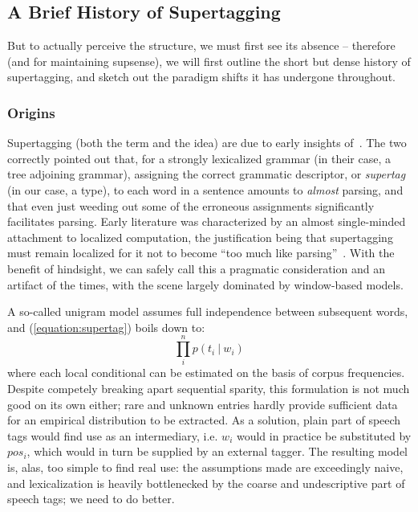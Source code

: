 \subsection{A Brief History of Supertagging}
But to actually perceive the structure, we must first see its absence -- therefore (and for maintaining supsense), we will first outline the short but dense history of supertagging, and sketch out the paradigm shifts it has undergone throughout.

\subsubsection{Origins}
Supertagging (both the term and the idea) are due to early insights of~\citet{joshi1994disambiguation}.
The two correctly pointed out that, for a strongly lexicalized grammar (in their case, a tree adjoining grammar), assigning the correct grammatic descriptor, or \textit{supertag} (in our case, a type), to each word in a sentence amounts to \textit{almost} parsing, and that even just weeding out some of the erroneous assignments significantly facilitates parsing.
Early literature was characterized by an almost single-minded attachment to localized computation, the justification being that supertagging must remain localized for it not to become ``too much like parsing''~\cite{bangalore1999supertagging}.
With the benefit of hindsight, we can safely call this a pragmatic consideration and an artifact of the times, with the scene largely dominated by window-based models.

A so-called unigram model assumes full independence between subsequent words, and (\ref{equation:supertag}) boils down to:
\begin{equation}
\prod_i^n p(t_i \ | \ w_i)
\end{equation}
where each local conditional can be estimated on the basis of corpus frequencies.
Despite competely breaking apart sequential sparity, this formulation is not much good on its own either; rare and unknown entries hardly provide sufficient data for an empirical distribution to be extracted.
As a solution, plain part of speech tags would find use as an intermediary, i.e. $w_i$ would in practice be substituted by $pos_i$, which would in turn be supplied by an external tagger.
The resulting model is, alas, too simple to find real use: the assumptions made are exceedingly naive, and lexicalization is heavily bottlenecked by the coarse and undescriptive part of speech tags; we need to do better.

